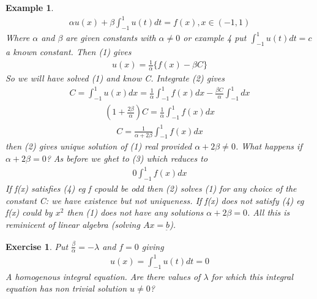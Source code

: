 \documentclass[10pt, oneside]{article}
\newtheorem{example}{Example}
\newtheorem{exe}{Exercise}
\begin{document}
\begin{example}
    \begin{align}
        \alpha u(x) + \beta \int_{-1}^{1} u(t) dt = f(x), x \in (-1,1)
    \end{align}
    Where $\alpha$ and $\beta$ are given constants with $\alpha \neq 0$ or example 4 put $\int_{-1}^{1} u(t) dt = c$ a known constant. Then (1) gives
    \begin{align}
        u(x) = \frac{1}{\alpha} \{f(x) - \beta C\}
    \end{align}
    So we will have solved (1) and know C. Integrate (2) gives
    \begin{align*}
        C = \int_{-1}^{1} u(x) dx = \frac{1}{\alpha} \int_{-1}^{1} f(x)dx - \frac{\beta C}{\alpha}\int_{-1}^{1} dx
    \end{align*}
    \begin{align}
        (1+\frac{2\beta}{\alpha})C = \frac{1}{\alpha}\int_{-1}^{1} f(x)dx
    \end{align}
    \begin{align*}
        C = \frac{1}{\alpha + 2\beta}\int_{-1}^{1} f(x) dx
    \end{align*}
    then (2) gives unique solution of (1) real provided $\alpha + 2 \beta \neq 0$. What happens if $\alpha + 2\beta =0 $? As before we ghet to (3) which reduces to 
    \begin{align}
        0\int_{-1}^{1} f(x) dx
    \end{align}
    If f(x) satisfies (4) eg f cpould be odd then (2) solves (1) for any choice of the constant C: we have existence but not uniqueness. If f(x) does not satisfy (4) eg f(x) could by $x^{2}$ then (1) does not have any solutions $\alpha + 2\beta=0$. All this is reminicent of linear algebra (solving $Ax=\underset{\tilde{}}{b}$).
\end{example}
\begin{exe}
    Put $\frac{\beta}{\alpha}=-\lambda$ and $f=0$ giving
    \begin{align*}
        u(x) = \int_{-1}^{1} u(t) dt = 0
    \end{align*}
    A homogenous integral equation. Are there values of $\lambda$ for which this integral equation has non trivial solution $u\neq 0$?
\end{exe}
\end{document}
